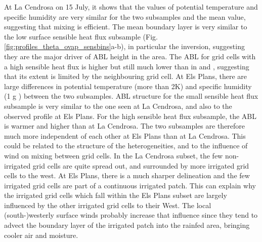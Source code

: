 At La Cendrosa on 15 July, it shows that the values of potential temperature and specific humidity are very similar for the two subsamples and the mean value, suggesting that mixing is efficient.
The mean boundary layer is very similar to the low surface sensible heat flux subsample (Fig. \ref{fig:profiles_theta_ovap_sensbins}a-b), in particular the inversion, suggesting they are the major driver of ABL height in the area. The ABL for grid cells with a high sensible heat flux is higher but still much lower than in \noirr and \irr, suggesting that its extent is limited by the neighbouring grid cell.
At Els Plans, there are large differences in potential temperature (more than 2K) and specific humidity (1 g \perkg) between the two subsamples.
ABL structure for the small sensible heat flux subsample is very similar to the one seen at La Cendrosa, and also to the observed profile at Els Plans. For the high sensible heat flux subsample, the ABL is warmer and higher than at La Cendrosa. 
The two subsamples are therefore much more independent of each other at Els Plans than at La Cendrosa. This could be related to the structure of the heterogeneities, and to the influence of wind on mixing between grid cells.
In the La Cendrosa subset, the few non-irrigated grid cells are quite spread out, and surrounded by more irrigated grid cells to the west. At Els Plans, there is a much sharper delineation and the few irrigated grid cells are part of a continuous irrigated patch. This can explain why the irrigated grid cells which fall within the Els Plans subset are largely influenced by the other irrigated grid cells to their West. 
The local (south-)westerly surface winds probably increase that influence since they tend to advect the boundary layer of the irrigated patch into the rainfed area, bringing cooler air and moisture.

